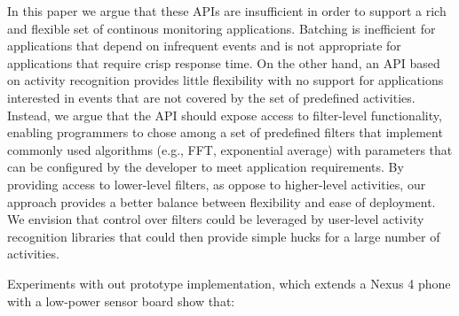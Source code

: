 In this paper we argue that these APIs are insufficient in order to
support a rich and flexible set of continous monitoring applications.
Batching is inefficient for applications that depend on infrequent
events and is not appropriate for applications that require crisp
response time.  On the other hand, an API based on activity
recognition provides little flexibility with no support for
applications interested in events that are not covered by the set of
predefined activities.  Instead, we argue that the API should expose
access to filter-level functionality, enabling programmers to chose
among a set of predefined filters that implement commonly used
algorithms (e.g., FFT, exponential average) with parameters that can
be configured by the developer to meet application requirements.  By
providing access to lower-level filters, as oppose to higher-level
activities, our approach provides a better balance between flexibility
and ease of deployment.  We envision that control over filters could
be leveraged by user-level activity recognition libraries that could
then provide simple hucks for a large number of activities.

Experiments with out prototype implementation, which extends a Nexus 4
phone with a low-power sensor board show that:

